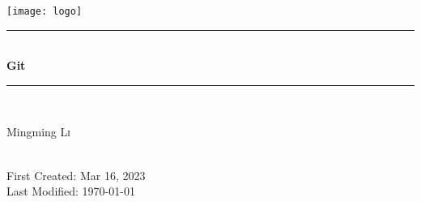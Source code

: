 \newcommand{\mytitle}{Git}
\newcommand{\firstcreated}{Mar 16, 2023}

\begin{titlepage}

\newcommand{\HRule}{\rule{\linewidth}{0.5mm}} %

\center                         %
 

\texttt{[image: logo]}\\[1cm] %


\HRule\\[0.4cm]
{ \huge \bfseries \mytitle}\\[0.4cm] %
\HRule\\[1.5cm]
 

\begin{minipage}{0.4\textwidth}
\begin{center} \large
Mingming \textsc{Li}\\ %
\end{center}

\end{minipage}\\[2cm]


\vfill
{\large First Created: \firstcreated}\\
{\large Last Modified: \today}\\[2cm] %



\end{titlepage}


